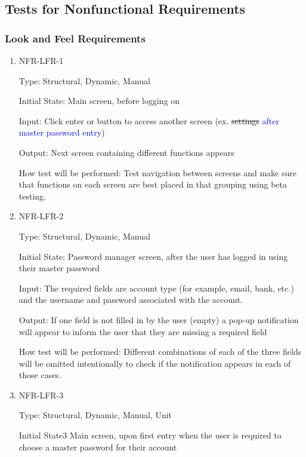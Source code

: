\documentclass[12pt, titlepage]{article}
\begin{document}
\subsection{Tests for Nonfunctional Requirements}

\subsubsection{Look and Feel Requirements}

\begin{enumerate}

\item{NFR-LFR-1\\}

Type: Structural, Dynamic, Manual

Initial State: Main screen, before logging on

Input: Click enter or button to access another screen (ex. \sout{settings} \textcolor{blue}{after master password entry})

Output: Next screen containing different functions appears

How test will be performed: Test navigation between screens and make sure that functions on each screen are best placed in that grouping using beta testing.

\item{NFR-LFR-2\\}

Type: Structural, Dynamic, Manual

Initial State: Password manager screen, after the user has logged in using their master password

Input: The required fields are account type (for example, email, bank, etc.) and the username and password associated with the account.

Output: If one field is not filled in by the user (empty) a pop-up notification will appear to inform the user that they are missing a required field

How test will be performed: Different combinations of each of the three fields will be omitted intentionally to check if the notification appears in each of those cases.

\item{NFR-LFR-3\\}

Type: Structural, Dynamic, Manual, Unit

Initial State3 Main screen, upon first entry when the user is required to choose a master password for their account


\end{enumerate}
\end{document}
